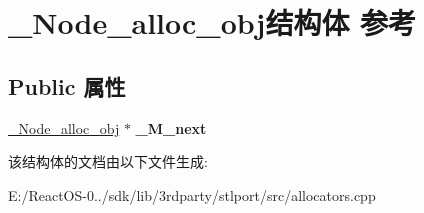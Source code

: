 \hypertarget{struct___node__alloc__obj}{}\section{\+\_\+\+Node\+\_\+alloc\+\_\+obj结构体 参考}
\label{struct___node__alloc__obj}
\subsection*{Public 属性}
\begin{DoxyCompactItemize}
\item 
\mbox{\label{struct___node__alloc__obj_a1a3176408c4171b45f8d293a794dec66}} 
\hyperlink{struct___node__alloc__obj}{\+\_\+\+Node\+\_\+alloc\+\_\+obj} $\ast$ {\bfseries \+\_\+\+M\+\_\+next}
\end{DoxyCompactItemize}


该结构体的文档由以下文件生成\+:\begin{DoxyCompactItemize}
\item 
E\+:/\+React\+O\+S-\/0../sdk/lib/3rdparty/stlport/src/allocators.\+cpp\end{DoxyCompactItemize}
